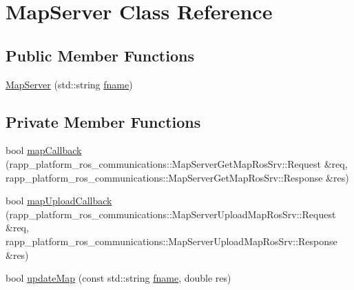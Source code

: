 \hypertarget{classMapServer}{\section{Map\-Server Class Reference}
\label{classMapServer}
}
\subsection*{Public Member Functions}
\begin{DoxyCompactItemize}
\item 
\hyperlink{classMapServer_a97df74346b07a9a1484664a0c41d5bdd}{Map\-Server} (std\-::string \hyperlink{classMapServer_ad6965ce117f3fd625ee154c9401adbd1}{fname})
\end{DoxyCompactItemize}
\subsection*{Private Member Functions}
\begin{DoxyCompactItemize}
\item 
bool \hyperlink{classMapServer_ac6d14174ad41d296a33f6477f5f1ca73}{map\-Callback} (rapp\-\_\-platform\-\_\-ros\-\_\-communications\-::\-Map\-Server\-Get\-Map\-Ros\-Srv\-::\-Request \&req, rapp\-\_\-platform\-\_\-ros\-\_\-communications\-::\-Map\-Server\-Get\-Map\-Ros\-Srv\-::\-Response \&res)
\item 
bool \hyperlink{classMapServer_a2c261b01ef4787563d6921a8819bcc07}{map\-Upload\-Callback} (rapp\-\_\-platform\-\_\-ros\-\_\-communications\-::\-Map\-Server\-Upload\-Map\-Ros\-Srv\-::\-Request \&req, rapp\-\_\-platform\-\_\-ros\-\_\-communications\-::\-Map\-Server\-Upload\-Map\-Ros\-Srv\-::\-Response \&res)
\item 
bool \hyperlink{classMapServer_a3850ab709ee42eb8b0179d9838887905}{update\-Map} (const std\-::string \hyperlink{classMapServer_ad6965ce117f3fd625ee154c9401adbd1}{fname}, double res)
\end{DoxyCompactItemize}
